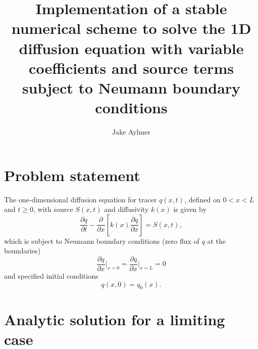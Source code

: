 \documentclass[12pt]{article}
\begin{document}
\thispagestyle{empty}

\title{Implementation of a stable numerical scheme to solve the 1D diffusion equation with variable coefficients and source terms subject to Neumann boundary conditions}
\author{Jake Aylmer}
\maketitle

\section{Problem statement}

The one-dimensional diffusion equation for tracer $q(x,t)$, defined on $0<x<L$ and $t\geq 0$, with source $S(x,t)$ and diffusivity $k(x)$ is given by
\begin{equation}\label{eq:diffusionequation}
\frac{\partial q}{\partial t} - \frac{\partial}{\partial x}\left[k(x)\frac{\partial q}{\partial x}\right] = S(x,t),
\end{equation}
which is subject to Neumann boundary conditions (zero flux of $q$ at the boundaries)
\begin{equation}\label{eq:boundaryconditions}
\frac{\partial q}{\partial x}\Bigr|_{x=0} = \frac{\partial q}{\partial x}\Bigr|_{x=L}= 0
\end{equation}
and specified initial conditions
\begin{equation}\label{eq:initialconditions}
q(x,0) = q_0(x).
\end{equation}

\section{Analytic solution for a limiting case}
\end{document}
